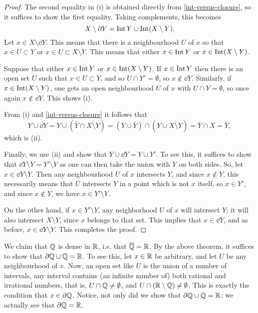 \begin{proof}
  The second equality in (i) is obtained directly from \eqref{int-versus-closure}, so it suffices to show the first equality. Taking complements, this becomes
  \[
    X \setminus \partial Y = \operatorname{Int} Y \cup \operatorname{Int} (X \setminus Y).
  \]
  Let $x \in X \setminus \dd Y$. This means that there is a neighbourhood $U$ of $x$ so that $x \in U \subset Y$ or $x \in U \subset X \setminus Y$. This means that either $x \in \operatorname{Int} Y$ or $x \in \operatorname{Int} (X \setminus Y)$.
  
  Suppose that either $x \in \operatorname{Int} Y$ or $x \in \operatorname{Int} (X \setminus Y)$. If $x \in \operatorname{Int} Y$ then there is an open set $U$ such that $x \in U \subset Y$, and so $U \cap Y^c = \emptyset$, so $x \notin \dd Y$. Similarly, if $x \in \operatorname{Int}(X \setminus Y)$, one gets an open neighbourhood $U$ of $x$ with $U \cap Y = \emptyset$, so once again $x \notin \dd Y$. This shows (i).
  
  From (i) and \eqref{int-versus-closure} it follows that
  \[
    Y \cup \dd Y = Y \cup (\bar Y \cap \bar{X \setminus Y}) = (Y \cup \bar Y) \cap (Y \cup \bar{X \setminus Y}) = \bar Y \cap X = \bar Y,
  \]
  which is (ii).
  
  Finally, we use (ii) and show that $Y \cup \dd Y = Y \cup Y'$. To see this, it suffices to show that $\dd Y \setminus Y = Y' \setminus Y$ as one can then take the union with $Y$ on both sides. So, let $x \in \dd Y \setminus Y$. Then any neighbourhood $U$ of $x$ intersects $Y$, and since $x \notin Y$, this necessarily means that $U$ intersects $Y$ in a point which is not $x$ itself, so $x \in Y'$, and since $x \notin Y$, we have $x \in Y' \setminus Y$.
  
  On the other hand, if $x \in Y' \setminus Y$, any neighborhood $U$ of $x$ will intersect $Y$; it will also intersect $X \setminus Y$, since $x$ belongs to that set. This implies that $x \in \dd Y$, and as before, $x \in \dd Y \setminus Y$. This completes the proof.
\end{proof}
\begin{example}
  We claim that $\mathbb{Q}$ is dense in $\mathbb{R}$, i.e. that $\overline {\mathbb{Q}} = \mathbb{R}$. By the above theorem, it suffices to show that $\partial \mathbb{Q} \cup \mathbb{Q} = \mathbb{R}$. To see this, let $x \in \mathbb{R}$ be arbitrary, and let $U$ be any neighbourhood of $x$. Now, an open set like $U$ is the union of a number of intervals, any interval contains (an infinite number of) both rational and irrational numbers, that is, $U \cap \mathbb{Q} \not= \emptyset$, and $U \cap (\mathbb{R} \setminus \mathbb{Q}) \not= \emptyset$. This is exactly the condition that $x \in \partial \mathbb{Q}$. Notice, not only did we show that $\partial \mathbb{Q} \cup \mathbb{Q} = \mathbb{R}$; we actually see that $\partial \mathbb{Q} = \mathbb{R}$.
\end{example}
